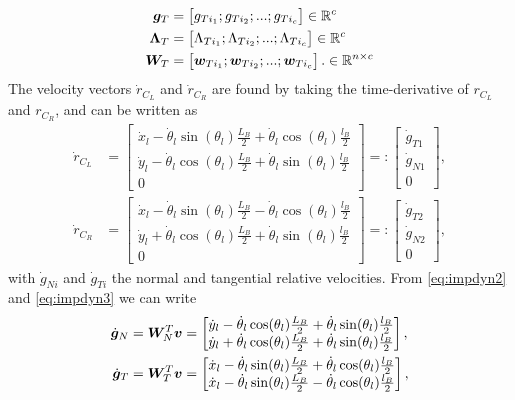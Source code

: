 \documentclass[../DC2017114Bouma.tex]{subfiles}
\begin{document}
\begin{align}
{\boldsymbol{g}}_T &= \begin{bmatrix}
g_{Ti_1};g_{Ti_2};...;g_{Ti_c}
\end{bmatrix}\in\mathbb{R}^{c}\\
\boldsymbol{\Lambda}_T &= \begin{bmatrix}
\Lambda_{Ti_1};\Lambda_{Ti_2};...;\Lambda_{Ti_c}
\end{bmatrix}\in\mathbb{R}^{c}\\
{\boldsymbol{W}}_T &= \begin{bmatrix}
{\boldsymbol{w}}_{Ti_1};{\boldsymbol{w}}_{Ti_2};...;{\boldsymbol{w}}_{Ti_c}
\end{bmatrix}.\in\mathbb{R}^{n\times c}
\end{align}
The velocity vectors $\dot{r}_{C_L}$ and $\dot{r}_{C_R}$ are found by taking the time-derivative of $r_{C_L}$ and $r_{C_R}$, and can be written as
\begin{align}
\dot{r}_{C_L} &= \begin{bmatrix}
\dot{x}_l -\dot{\theta}_l\sin(\theta_l)\frac{L_B}{2} + \dot{\theta}_l\cos(\theta_l)\frac{l_B}{2}\\
\dot{y}_l -\dot{\theta}_l\cos(\theta_l)\frac{L_B}{2} + \dot{\theta}_l\sin(\theta_l)\frac{l_B}{2}\\
0
\end{bmatrix}=:\begin{bmatrix}
\dot{g}_{T1}\\
\dot{g}_{N1}\\
0
\end{bmatrix},\label{eq:dotrCL}\\
\dot{r}_{C_R} &= \begin{bmatrix}
\dot{x}_l -\dot{\theta}_l\sin(\theta_l)\frac{L_B}{2} - \dot{\theta}_l\cos(\theta_l)\frac{l_B}{2}\\
\dot{y}_l +\dot{\theta}_l\cos(\theta_l)\frac{L_B}{2} + \dot{\theta}_l\sin(\theta_l)\frac{l_B}{2}\\
0
\end{bmatrix}=:\begin{bmatrix}
\dot{g}_{T2}\\
\dot{g}_{N2}\\
0
\end{bmatrix},\label{eq:dotrCR}
\end{align}
with $\dot{g}_{Ni}$ and $\dot{g}_{Ti}$ the normal and tangential relative velocities. From \eqref{eq:impdyn2} and \eqref{eq:impdyn3} we can write
\begin{align}
\dot{{\boldsymbol{g}}}_N &= {\boldsymbol{W}}_N^T{\boldsymbol{v}} = \begin{bmatrix}
\dot{y}_l -\dot{\theta}_l\cos(\theta_l)\frac{L_B}{2} + \dot{\theta}_l\sin(\theta_l)\frac{l_B}{2}\\
\dot{y}_l +\dot{\theta}_l\cos(\theta_l)\frac{L_B}{2} + \dot{\theta}_l\sin(\theta_l)\frac{l_B}{2}
\end{bmatrix},\\
\dot{{\boldsymbol{g}}}_T &= {\boldsymbol{W}}_T^T{\boldsymbol{v}} = \begin{bmatrix}
\dot{x}_l -\dot{\theta}_l\sin(\theta_l)\frac{L_B}{2} + \dot{\theta}_l\cos(\theta_l)\frac{l_B}{2}\\
\dot{x}_l -\dot{\theta}_l\sin(\theta_l)\frac{L_B}{2} - \dot{\theta}_l\cos(\theta_l)\frac{l_B}{2}
\end{bmatrix},
\end{align}
\end{document}
